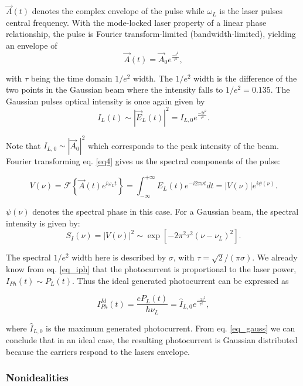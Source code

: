 $\vec{A}(t)$ denotes the complex envelope of the pulse while $\omega_L$ is the laser pulses central frequency. With the mode-locked laser property of a linear phase relationship, the pulse is Fourier transform-limited (bandwidth-limited), yielding an envelope of
\begin{equation}
	\vec{A}(t) = \vec{A}_0 e^{\frac{-t^2}{\tau^2}},
\end{equation}

with $\tau$ being the time domain $1/e^2$ width. The  $1/e^2$ width is the difference of the two points in the Gaussian beam where the intensity falls to $1/e^2 = 0.135$. The Gaussian pulses optical intensity is once again given by
\begin{equation}
	I_L(t) \sim |\vec{E}_L(t)|^2 = I_{L,0}e^{\frac{-2t^2}{\tau ^2}}.
\end{equation} 

Note that $I_{L,0} \sim |\vec{A}_0|^2$ which corresponds to the peak intensity of the beam. 
Fourier transforming eq. \eqref{eq4} gives us the spectral components of the pulse:

\begin{equation}
	V(\nu) =  \mathcal{F}\left\{\vec{A}(t)e^{i\omega_Lt} \right\}
	= \int_{-\infty}^{+\infty}E_L(t)e^{-i2\pi\nu t}dt = |V(\nu)|e^{i\psi(\nu)}.
\end{equation}

$\psi(\nu)$ denotes the spectral phase in this case. For a Gaussian beam, the spectral intensity is given by:
\begin{equation}
	S_I(\nu) = |V(\nu)|^2 \sim \exp[-2\pi^2\tau^2(\nu - \nu_L)^2]. 
\end{equation}

The spectral $1/e^2$ width here is described by $\sigma$, with $\tau = \sqrt{2}/(\pi \sigma)$. We already know from eq. \eqref{eq_iph} that the photocurrent is proportional to the laser power, $I_{Ph}(t) \sim P_L(t)$. Thus the ideal generated photocurrent can be expressed as 

\begin{equation}
	I_{Ph}^{Id}(t) = \frac{eP_L(t)}{h\nu_L} = \hat{I}_{L,0} e^{\frac{-2t^2}{\tau^2}},
\label{eq_gauss}
\end{equation}

where $\hat{I}_{L,0}$ is the maximum generated photocurrent. From eq. \eqref{eq_gauss} we can conclude that in an ideal case, the resulting photocurrent is Gaussian distributed because the carriers respond to the lasers envelope. 

\subsubsection{Nonidealities}

